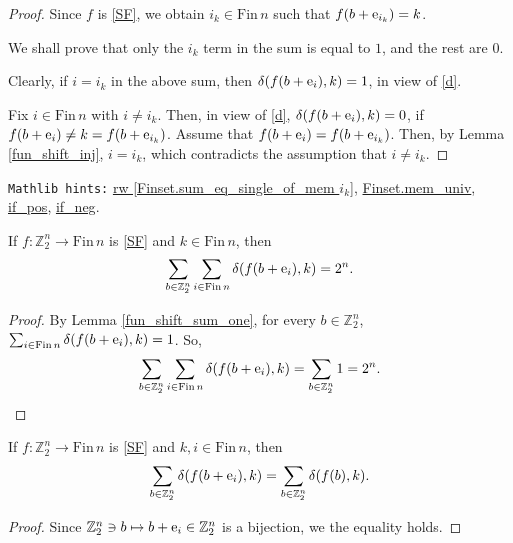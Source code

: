 \documentclass[11pt]{amsart}
\newcommand{\Zz}{\mathbb{Z}_2}
\newcommand{\Fin}{\mathrm{Fin}\,}
\newcommand{\B}{\color{blue}}
\begin{document}
\begin{proof}
Since $f$ is \eqref{SF}, we {\B obtain} $i_k\in\Fin n$ such that $f(b+{\rm e}_{i_k}) = k$. 

We shall prove that {\B only the $i_k$ term in the sum is equal to $1$, and the rest are $0$}.

Clearly, if $i=i_k$ in the above sum, then $\delta(f(b+{\rm e}_i),k) = 1$, in view of \eqref{d}. 

Fix $i\in\Fin n$ with $i\neq i_k$. Then, in view of \eqref{d}, $\delta(f(b+{\rm e}_i),k) = 0$, if $f(b+{\rm e}_i) \neq k = f(b+{\rm e}_{i_k})$. Assume that $f(b+{\rm e}_i) = f(b+{\rm e}_{i_k})$. Then, by Lemma \ref{fun_shift_inj}, $i=i_k$, which {\B contradicts} the assumption that $i\neq i_k$. 
\end{proof}

\verb|Mathlib hints:| \href{https://leanprover-community.github.io/mathlib4_docs/Mathlib/Algebra/BigOperators/Group/Finset/Basic.html#Finset.sum_eq_single_of_mem}{rw [Finset.sum\_eq\_single\_of\_mem $i_k$]}, \href{https://leanprover-community.github.io/mathlib4_docs/Mathlib/Data/Fintype/Defs.html#Finset.mem_univ}{Finset.mem\_univ}, \href{https://leanprover-community.github.io/mathlib4_docs/Init/Core.html#if_pos}{if\_pos}, \href{https://leanprover-community.github.io/mathlib4_docs/Init/Core.html#if_neg}{if\_neg}.

\bigskip

\begin{lemma}
\label{fun_shift_sum_pow2} If $f:\Zz^n \to \Fin n$ is \eqref{SF} and $k\in\Fin n$, then
$$\sum_{b\in\Zz^n} \sum_{i\in\Fin n} \delta(f(b+{\rm e}_i),k) = 2^n.$$
\end{lemma}

\begin{proof}
By Lemma \ref{fun_shift_sum_one}, for every $b\in\Zz^n$, $\sum_{i\in\Fin n} \delta(f(b+{\rm e}_i),k) = 1$. So,
$$\sum_{b\in\Zz^n} \sum_{i\in\Fin n} \delta(f(b+{\rm e}_i),k) = \sum_{b\in\Zz^n} 1 = 2^n.$$
\end{proof}

\bigskip

\begin{lemma}
\label{fun_shift_sum_rev} If $f:\Zz^n \to \Fin n$ is \eqref{SF} and $k,i\in\Fin n$, then
$$\sum_{b\in\Zz^n} \delta(f(b+{\rm e}_i),k) = \sum_{b\in\Zz^n} \delta(f(b),k).$$
\end{lemma}

\begin{proof}
Since $\Zz^n \ni b \mapsto b + {\rm e}_i \in \Zz^n$ is a {\B bijection}, we the equality holds.
\end{proof}
\end{document}
